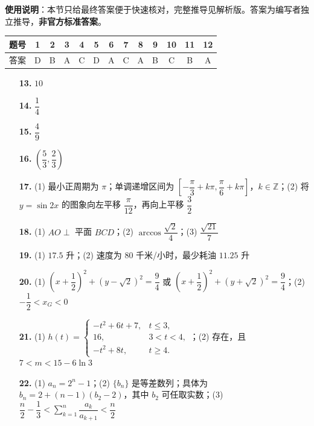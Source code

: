 
\begin{gknotice}
\textbf{使用说明}：本节只给最终答案便于快速核对，完整推导见解析版。答案为编写者独立推导，\textbf{非官方标准答案}。
\end{gknotice}

\begin{center}\begin{tabular}{ccccccccccccc}
\toprule
题号 & 1 & 2 & 3 & 4 & 5 & 6 & 7 & 8 & 9 & 10 & 11 & 12 \\
\midrule
答案 & D & B & A & C & D & A & C & A & B & C & B & A \\
\bottomrule
\end{tabular}\end{center}

\begin{itemize}[leftmargin=2.6em]
  \item[\textbf{13.}] $10$
  \item[\textbf{14.}] $\dfrac14$
  \item[\textbf{15.}] $\dfrac49$
  \item[\textbf{16.}] $\left(\dfrac53,\dfrac23\right)$
\end{itemize}

\begin{itemize}[leftmargin=2.6em]
  \item[\textbf{17.}] (1) 最小正周期为 $\pi$；单调递增区间为 $\left[-\dfrac\pi3+k\pi,\dfrac\pi6+k\pi\right]$，$k\in\mathbb Z$；(2) 将 $y=\sin2x$ 的图象向左平移 $\dfrac\pi{12}$，再向上平移 $\dfrac32$
  \item[\textbf{18.}] (1) $AO\perp$ 平面 $BCD$；(2) $\arccos\dfrac{\sqrt2}{4}$；(3) $\dfrac{\sqrt{21}}7$
  \item[\textbf{19.}] (1) $17.5$ 升；(2) 速度为 $80$ 千米/小时，最少耗油 $11.25$ 升
  \item[\textbf{20.}] (1) $\left(x+\dfrac12\right)^2+(y-\sqrt2)^2=\dfrac94$ 或 $\left(x+\dfrac12\right)^2+(y+\sqrt2)^2=\dfrac94$；(2) $-\dfrac12<x_G<0$
  \item[\textbf{21.}] (1) $h(t)=\begin{cases}-t^2+6t+7,&t\le3,\\16,&3<t<4,\\-t^2+8t,&t\ge4.\end{cases}$；(2) 存在，且 $7<m<15-6\ln3$
  \item[\textbf{22.}] (1) $a_n=2^n-1$；(2) $\{b_n\}$ 是等差数列；具体为 $b_n=2+(n-1)(b_2-2)$，其中 $b_2$ 可任取实数；(3) $\dfrac n2-\dfrac13<\displaystyle\sum_{k=1}^n\dfrac{a_k}{a_{k+1}}<\dfrac n2$
\end{itemize}
